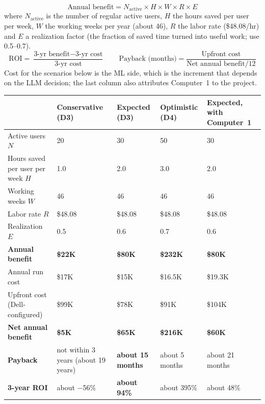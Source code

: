 
\[
  \text{Annual benefit} = N_{\text{active}} \times H \times W \times R \times E
\]
where $N_{\text{active}}$ is the number of regular active users, $H$ the hours saved
per user per week, $W$ the working weeks per year (about 46), $R$ the labor rate
(\$48.08/hr) and $E$ a realization factor (the fraction of saved time turned into
useful work; use 0.5--0.7).
\[
  \text{ROI} = \frac{\text{3-yr benefit} - \text{3-yr cost}}{\text{3-yr cost}}
  \qquad
  \text{Payback (months)} = \frac{\text{Upfront cost}}{\text{Net annual benefit}/12}
\]
Cost for the scenarios below is the ML side, which is the increment that depends on
the LLM decision; the last column also attributes Computer~1 to the project.


{\footnotesize
\begin{xltabular}{\textwidth}{@{}Y{1.2} Y{0.95} Y{0.95} Y{0.95} Y{0.95}@{}}
  \toprule
  & Conservative (D3) & Expected (D3) & Optimistic (D4) & Expected, with Computer~1 \\
  \midrule
  \endhead
  Active users $N$ & 20 & 30 & 50 & 30 \\
  Hours saved per user per week $H$ & 1.0 & 2.0 & 3.0 & 2.0 \\
  Working weeks $W$ & 46 & 46 & 46 & 46 \\
  Labor rate $R$ & \$48.08 & \$48.08 & \$48.08 & \$48.08 \\
  Realization $E$ & 0.5 & 0.6 & 0.7 & 0.6 \\
  \textbf{Annual benefit} & \textbf{\$22K} & \textbf{\$80K} & \textbf{\$232K} & \textbf{\$80K} \\
  Annual run cost & \$17K & \$15K & \$16.5K & \$19.3K \\
  Upfront cost (Dell-configured) & \$99K & \$78K & \$91K & \$104K \\
  \textbf{Net annual benefit} & \textbf{\$5K} & \textbf{\$65K} & \textbf{\$216K} & \textbf{\$60K} \\
  \textbf{Payback} & not within 3 years (about 19 years) & \textbf{about 15 months} & about 5 months & about 21 months \\
  \textbf{3-year ROI} & about $-$56\% & \textbf{about 94\%} & about 395\% & about 48\% \\
  \bottomrule
\end{xltabular}}

